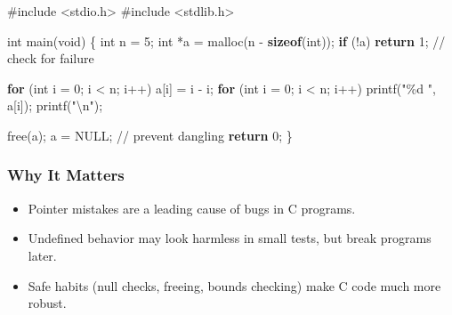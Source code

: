 \documentclass[
  letterpaper,
  DIV=11,
  numbers=noendperiod]{scrreprt}
\newenvironment{Shaded}{\begin{snugshade}}{\end{snugshade}}
\newcommand{\CommentTok}[1]{\textcolor[rgb]{0.37,0.37,0.37}{#1}}
\newcommand{\ControlFlowTok}[1]{\textcolor[rgb]{0.00,0.23,0.31}{\textbf{#1}}}
\newcommand{\DataTypeTok}[1]{\textcolor[rgb]{0.68,0.00,0.00}{#1}}
\newcommand{\DecValTok}[1]{\textcolor[rgb]{0.68,0.00,0.00}{#1}}
\newcommand{\ImportTok}[1]{\textcolor[rgb]{0.00,0.46,0.62}{#1}}
\newcommand{\KeywordTok}[1]{\textcolor[rgb]{0.00,0.23,0.31}{\textbf{#1}}}
\newcommand{\NormalTok}[1]{\textcolor[rgb]{0.00,0.23,0.31}{#1}}
\newcommand{\OperatorTok}[1]{\textcolor[rgb]{0.37,0.37,0.37}{#1}}
\newcommand{\PreprocessorTok}[1]{\textcolor[rgb]{0.68,0.00,0.00}{#1}}
\newcommand{\SpecialCharTok}[1]{\textcolor[rgb]{0.37,0.37,0.37}{#1}}
\newcommand{\StringTok}[1]{\textcolor[rgb]{0.13,0.47,0.30}{#1}}
\providecommand{\tightlist}{%
  \setlength{\itemsep}{0pt}\setlength{\parskip}{0pt}}
\begin{document}
\begin{Shaded}
\begin{Highlighting}[]
\PreprocessorTok{\#include }\ImportTok{\textless{}stdio.h\textgreater{}}
\PreprocessorTok{\#include }\ImportTok{\textless{}stdlib.h\textgreater{}}

\DataTypeTok{int}\NormalTok{ main}\OperatorTok{(}\DataTypeTok{void}\OperatorTok{)} \OperatorTok{\{}
    \DataTypeTok{int}\NormalTok{ n }\OperatorTok{=} \DecValTok{5}\OperatorTok{;}
    \DataTypeTok{int} \OperatorTok{*}\NormalTok{a }\OperatorTok{=}\NormalTok{ malloc}\OperatorTok{(}\NormalTok{n }\OperatorTok{{-}} \KeywordTok{sizeof}\OperatorTok{(}\DataTypeTok{int}\OperatorTok{));}
    \ControlFlowTok{if} \OperatorTok{(!}\NormalTok{a}\OperatorTok{)} \ControlFlowTok{return} \DecValTok{1}\OperatorTok{;}   \CommentTok{// check for failure}

    \ControlFlowTok{for} \OperatorTok{(}\DataTypeTok{int}\NormalTok{ i }\OperatorTok{=} \DecValTok{0}\OperatorTok{;}\NormalTok{ i }\OperatorTok{\textless{}}\NormalTok{ n}\OperatorTok{;}\NormalTok{ i}\OperatorTok{++)}\NormalTok{ a}\OperatorTok{[}\NormalTok{i}\OperatorTok{]} \OperatorTok{=}\NormalTok{ i }\OperatorTok{{-}}\NormalTok{ i}\OperatorTok{;}
    \ControlFlowTok{for} \OperatorTok{(}\DataTypeTok{int}\NormalTok{ i }\OperatorTok{=} \DecValTok{0}\OperatorTok{;}\NormalTok{ i }\OperatorTok{\textless{}}\NormalTok{ n}\OperatorTok{;}\NormalTok{ i}\OperatorTok{++)}\NormalTok{ printf}\OperatorTok{(}\StringTok{"}\SpecialCharTok{\%d}\StringTok{ "}\OperatorTok{,}\NormalTok{ a}\OperatorTok{[}\NormalTok{i}\OperatorTok{]);}
\NormalTok{    printf}\OperatorTok{(}\StringTok{"}\SpecialCharTok{\textbackslash{}n}\StringTok{"}\OperatorTok{);}

\NormalTok{    free}\OperatorTok{(}\NormalTok{a}\OperatorTok{);}
\NormalTok{    a }\OperatorTok{=}\NormalTok{ NULL}\OperatorTok{;}           \CommentTok{// prevent dangling}
    \ControlFlowTok{return} \DecValTok{0}\OperatorTok{;}
\OperatorTok{\}}
\end{Highlighting}
\end{Shaded}

\subsubsection{Why It Matters}\label{why-it-matters-41}

\begin{itemize}
\tightlist
\item
  Pointer mistakes are a leading cause of bugs in C programs.
\item
  Undefined behavior may look harmless in small tests, but break
  programs later.
\item
  Safe habits (null checks, freeing, bounds checking) make C code much
  more robust.
\end{itemize}
\end{document}
